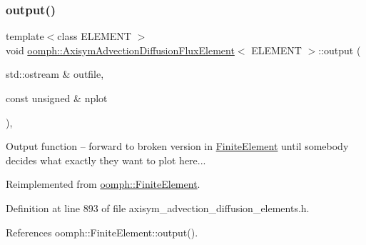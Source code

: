 \subsubsection{\texorpdfstring{output()}{output()}\hspace{0.1cm}{\footnotesize\ttfamily [2/2]}}
{\footnotesize\ttfamily template$<$class E\+L\+E\+M\+E\+NT $>$ \\
void \hyperlink{classoomph_1_1AxisymAdvectionDiffusionFluxElement}{oomph\+::\+Axisym\+Advection\+Diffusion\+Flux\+Element}$<$ E\+L\+E\+M\+E\+NT $>$\+::output (\begin{DoxyParamCaption}\item[{std\+::ostream \&}]{outfile,  }\item[{const unsigned \&}]{nplot }\end{DoxyParamCaption})\hspace{0.3cm}{\ttfamily [inline]}, {\ttfamily [virtual]}}



Output function -- forward to broken version in \hyperlink{classoomph_1_1FiniteElement}{Finite\+Element} until somebody decides what exactly they want to plot here... 



Reimplemented from \hyperlink{classoomph_1_1FiniteElement_afa9d9b2670f999b43e6679c9dd28c457}{oomph\+::\+Finite\+Element}.



Definition at line 893 of file axisym\+\_\+advection\+\_\+diffusion\+\_\+elements.\+h.



References oomph\+::\+Finite\+Element\+::output().

\mbox{\label{classoomph_1_1AxisymAdvectionDiffusionFluxElement_a328aa887d66fa0f5e2bec3ccc8db60fc}} 
